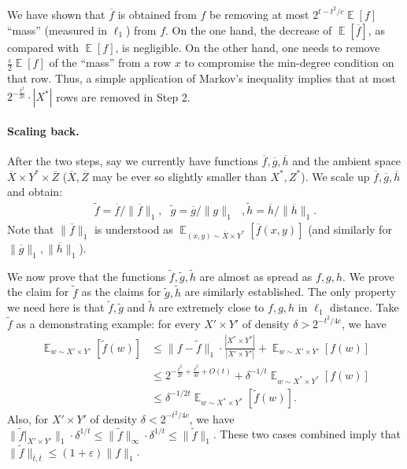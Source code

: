 \documentclass[11pt]{article}
\DeclareMathOperator*{\E}{\mathbb{E}}
\newcommand{\1}{ \mathbbm{1}}
\newcommand{\eps}{\varepsilon}
\begin{document}
We have shown that $\overline{f}$ is obtained from $f$ be removing at most $2^{t-t^2/c}\E[f]$ ``mass'' (measured in $\ell_1$) from $f$. On the one hand, the decrease of $\E[\overline{f}]$, as compared with $\E[f]$, is negligible. On the other hand, one needs to remove $\frac{\eps}{2}\E[f]$ of the ``mass'' from a row $x$ to compromise the min-degree condition on that row. Thus, a simple application of Markov's inequality implies that at most $2^{-\frac{t^2}{2c}}\cdot |X^*|$ rows are removed in Step 2.

\paragraph*{Scaling back.} After the two steps, say we currently have functions $\overline{f},\overline{g}, \overline{h}$ and the ambient space $\overline{X}\times Y^*\times \overline{Z}$ ($\overline{X},\overline{Z}$ may be ever so slightly smaller than $X^*,Z^*$). We scale up $\overline{f},\overline{g},\overline{h}$ and obtain:
$$
\begin{aligned}
\tilde{f} = \overline{f} / \| \overline{f} \|_1 , ~~~ \tilde{g} = \overline{g} / \|g\|_1 ~~~, \tilde{h} = \overline{h} / \|\overline{h}\|_1.
\end{aligned}
$$
Note that $\|\overline{f}\|_1$ is understood as $\E_{(x,y)\sim \overline{X}\times Y^*}[\overline{f}(x,y)]$ (and similarly for $\|\overline{g}\|_1, \|\overline{h}\|_1$).

We now prove that the functions $\tilde{f},\tilde{g},\tilde{h}$ are almost as spread as $f,g,h$. We prove the claim for $\tilde{f}$ as the claims for $\tilde{g},\tilde{h}$ are similarly established. The only property we need here is that $\tilde{f},\tilde{g}$ and $\tilde{h}$ are extremely close to $f,g,h$ in $\ell_1$ distance. Take $\tilde{f}$ as a demonstrating example: for every $X'\times Y'$ of density $\delta > 2^{-t^2/4c}$, we have
$$
\begin{aligned}
\E_{w\sim X'\times Y'}[\tilde{f}(w)] 
&\le \| f - \tilde{f} \|_1 \cdot \frac{|X^*\times Y^*|}{|X'\times Y'|}  +  \E_{w\sim X'\times Y'}[ f(w) ] \\
&\le 2^{-\frac{t^2}{2c} + \frac{t^2}{4c} + O(t)}  +  \delta^{-1/t} \E_{w\sim X^*\times Y^*}[ f(w) ] \\
&\le \delta^{-1/2t} \E_{w\sim X^*\times Y^*}[\tilde{f}(w)].
\end{aligned}
$$
Also, for $X'\times Y'$ of density $\delta < 2^{-t^2/4c}$, we have $\|\tilde{f}|_{X'\times Y'}\|_1 \cdot \delta^{1/t} \le \|\tilde{f}\|_{\infty} \cdot \delta^{1/t} \le \|\tilde{f}\|_1$. These two cases combined imply that $\|\tilde{f}\|_{\overline{t},\overline{t}}\le (1+\eps)\|f\|_1$.
\end{document}
